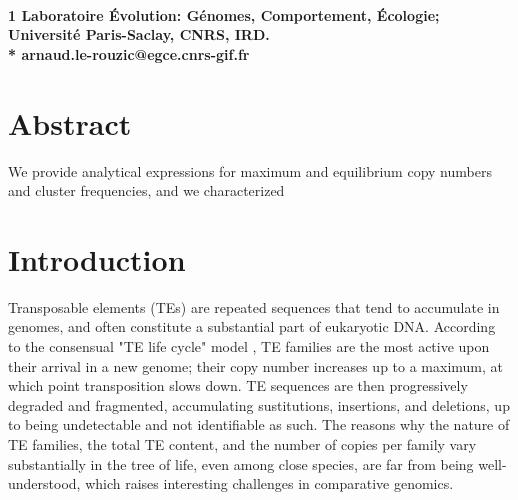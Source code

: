 \documentclass[10pt,a4paper]{article}
\title{}
\date{}
\begin{document}
\vspace*{0.35in}

\begin{flushleft}
{\Large
\textbf{}
}
\newline
\\
\bigskip
\bf{1} Laboratoire Évolution: Génomes, Comportement, Écologie; Université Paris-Saclay, CNRS, IRD.
\\
\bigskip
* arnaud.le-rouzic@egce.cnrs-gif.fr

\end{flushleft}

\section*{Abstract}

We provide analytical expressions for maximum and equilibrium copy numbers and cluster frequencies, and we characterized 


\linenumbers

\section{Introduction}

Transposable elements (TEs) are repeated sequences that tend to accumulate in genomes, and often constitute a substantial part of eukaryotic DNA. According to the consensual "TE life cycle" model \citep{KL01}, TE families are the most active upon their arrival in a new genome; their copy number increases up to a maximum, at which point transposition slows down. TE sequences are then progressively degraded and fragmented, accumulating sustitutions, insertions, and deletions, up to being undetectable and not identifiable as such. The reasons why the nature of TE families, the total TE content, and the number of copies per family vary substantially in the tree of life, even among close species, are far from being well-understood, which raises interesting challenges in comparative genomics. 
\end{document}
